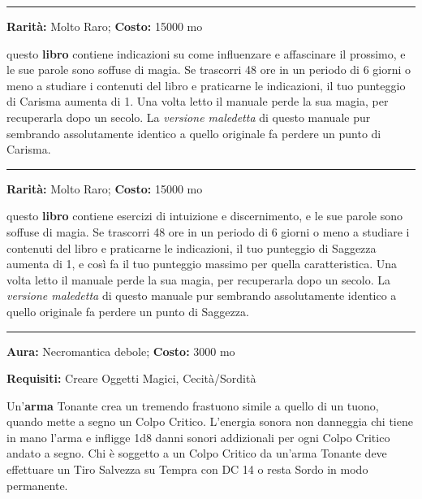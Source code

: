 \begin{multicols}{2}
\smallskip\noindent\rule{\linewidth}{2pt}  \hypertarget{Tomodell'Autoritàedell'Influenza}{}\medskip{}\noindent\label{Tomodell'Autoritàedell'Influenza}

\textbf{Rarità:} Molto Raro; \textbf{Costo:} 15000 mo

questo \textbf{libro} contiene indicazioni su come influenzare e affascinare il prossimo, e le sue parole sono soffuse di magia. Se trascorri 48 ore in un periodo di 6 giorni o meno a studiare i contenuti del libro e praticarne le indicazioni, il tuo punteggio di Carisma aumenta di 1. Una volta letto il manuale perde la sua magia, per recuperarla dopo un secolo. La \emph{versione maledetta} di questo manuale pur sembrando assolutamente identico a quello originale fa perdere un punto di Carisma.

\smallskip\noindent\rule{\linewidth}{2pt}  \hypertarget{TomodellaComprensione}{}\medskip{}\noindent\label{TomodellaComprensione}

\textbf{Rarità:} Molto Raro; \textbf{Costo:} 15000 mo

questo \textbf{libro} contiene esercizi di intuizione e discernimento, e le sue parole sono soffuse di magia. Se trascorri 48 ore in un periodo di 6 giorni o meno a studiare i contenuti del libro e praticarne le indicazioni, il tuo punteggio di Saggezza aumenta di 1, e così fa il tuo punteggio massimo per quella caratteristica. Una volta letto il manuale perde la sua magia, per recuperarla dopo un secolo. La \emph{versione maledetta} di questo manuale pur sembrando assolutamente identico a quello originale fa perdere un punto di Saggezza.

\smallskip\noindent\rule{\linewidth}{2pt}  \hypertarget{Tonante}{}\medskip{}\noindent\label{Tonante}

\textbf{Aura:} Necromantica debole; \textbf{Costo:} 3000 mo

\textbf{Requisiti:} Creare Oggetti Magici, Cecità/Sordità

Un'\textbf{arma} Tonante crea un tremendo frastuono simile a quello di un tuono, quando mette a segno un Colpo Critico. L'energia sonora non danneggia chi tiene in mano l'arma e infligge 1d8 danni sonori addizionali per ogni Colpo Critico andato a segno. Chi è soggetto a un Colpo Critico da un'arma Tonante deve effettuare un Tiro Salvezza su Tempra con DC 14 o resta Sordo in modo permanente.


\end{multicols}
